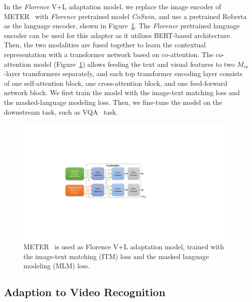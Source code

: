 \documentclass{article}
\begin{document}
In the \emph{Florence} V+L adaptation model, we replace the image encoder of METER~\cite{dou2021empirical} with \emph{Florence} pretrained model \emph{CoSwin}, and use a pretrained  Roberta~\cite{liu2019roberta} as the language encoder, shown in Figure~\ref{fig:florence_meter}. The \emph{Florence} pretrained language encoder can be used for this adapter as it utilizes BERT-based architecture. Then, the two modalities are fused together to learn the contextual representation with a transformer network based on co-attention. The co-attention model
(Figure~\ref{fig:florence_meter}) allows feeding the text and visual features to two $M_{co}$-layer transformers separately, and each top transformer encoding layer consists of one self-attention block, one cross-attention block, and one feed-forward network block. We first train the model with the image-text matching loss and the masked-language modeling loss. Then, we fine-tune the model on the downstream task, such as VQA~\cite{GoyalKSBP16} task.

\begin{figure}[t!]
    \centering
    \includegraphics[width=1.0\linewidth]{figure/meter.pdf}
    \caption{METER~\cite{dou2021empirical} is used as Florence V+L adaptation model, trained with
    the image-text matching (ITM) loss
    and the masked language modeling (MLM) loss.}
    \label{fig:florence_meter}
\end{figure}

\subsection{Adaption to Video Recognition}
\label{sect:adapt_video}
\end{document}
